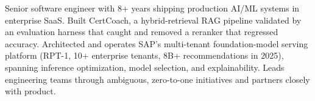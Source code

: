 
\begin{cvparagraph}
Senior software engineer with 8+ years shipping production AI/ML systems in enterprise SaaS. Built CertCoach, a hybrid-retrieval RAG pipeline validated by an evaluation harness that caught and removed a reranker that regressed accuracy. Architected and operates SAP's multi-tenant foundation-model serving platform (RPT-1, 10+ enterprise tenants, 8B+ recommendations in 2025), spanning inference optimization, model selection, and explainability. Leads engineering teams through ambiguous, zero-to-one initiatives and partners closely with product.
\end{cvparagraph}
